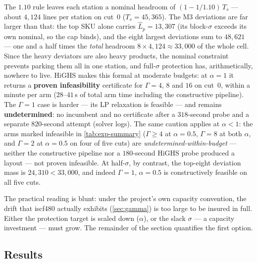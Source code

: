 The $1.10$ rule leaves each station a nominal headroom of
$(1 - 1/1.10)\,T_s$ --- about $4{,}124$ lines per station on cut~0
($T_s = 45{,}365$). The M3 deviations are far larger than that: the top SKU
alone carries $\hat L_p = 13{,}307$ (its block-$\sigma$ exceeds its own
nominal, so the cap binds), and the eight largest deviations sum to
$48{,}621$ --- one and a half times the \emph{total} headroom
$8 \times 4{,}124 \approx 33{,}000$ of the whole cell. Since the heavy
deviators are also heavy products, the nominal constraint prevents parking
them all in one station, and full-$\sigma$ protection has, arithmetically,
nowhere to live. HiGHS makes this formal at moderate budgets:
at $\alpha = 1$ it returns a \textbf{proven infeasibility} certificate for
$\Gamma = 4$, $8$ and $16$ on cut~0, within a minute per arm ($28$--$41$\,s
of total arm time including the constructive pipeline). The
$\Gamma = 1$ case is harder --- its LP relaxation is feasible --- and remains
\textbf{undetermined}: no incumbent and no certificate after a $318$-second
probe and a separate $820$-second attempt (solver logs). The same caution applies at
$\alpha < 1$: the arms marked infeasible in \cref{tab:exp-summary}
($\Gamma \ge 4$ at $\alpha = 0.5$, $\Gamma = 8$ at both $\alpha$, and
$\Gamma = 2$ at $\alpha = 0.5$ on four of five cuts) are
\emph{undetermined-within-budget} --- neither the constructive pipeline nor a
$180$-second HiGHS probe produced a layout --- not proven infeasible. At
half-$\sigma$, by contrast, the top-eight deviation mass is $24{,}310 <
33{,}000$, and indeed $\Gamma = 1$, $\alpha = 0.5$ is constructively feasible
on all five cuts.

The practical reading is blunt: under the project's own capacity convention,
the drift that iscf480 actually exhibits (\cref{sec:gamma}) is too large to be
insured in full. Either the protection target is scaled down ($\alpha$), or
the slack $\sigma$ --- a capacity investment --- must grow. The remainder of
the section quantifies the first option.

\subsection{Results}
\label{sec:exp-results}

